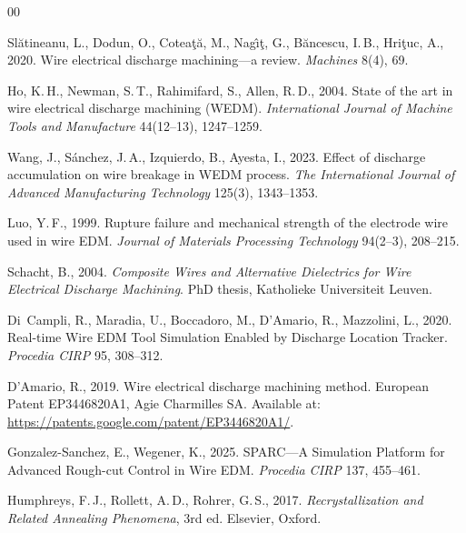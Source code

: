\documentclass[5p,times,procedia]{elsarticle}
\begin{document}
 \begin{thebibliography}{00}


Sl{\u{a}}tineanu, L., Dodun, O., Cotea{\c{t}}{\u{a}}, M., Nag{\^\i}{\c{t}}, G., B{\u{a}}ncescu, I.\,B., Hri{\c{t}}uc, A., 2020.
Wire electrical discharge machining---a review.
\textit{Machines} 8(4), 69.

Ho, K.\,H., Newman, S.\,T., Rahimifard, S., Allen, R.\,D., 2004.
State of the art in wire electrical discharge machining (WEDM).
\textit{International Journal of Machine Tools and Manufacture} 44(12--13), 1247--1259.

Wang, J., S{\'a}nchez, J.\,A., Izquierdo, B., Ayesta, I., 2023.
Effect of discharge accumulation on wire breakage in WEDM process.
\textit{The International Journal of Advanced Manufacturing Technology} 125(3), 1343--1353.

Luo, Y.\,F., 1999.
Rupture failure and mechanical strength of the electrode wire used in wire EDM.
\textit{Journal of Materials Processing Technology} 94(2--3), 208--215.

Schacht, B., 2004.
\textit{Composite Wires and Alternative Dielectrics for Wire Electrical Discharge Machining}.
PhD thesis, Katholieke Universiteit Leuven.

Di~Campli, R., Maradia, U., Boccadoro, M., D'Amario, R., Mazzolini, L., 2020.
Real-time Wire EDM Tool Simulation Enabled by Discharge Location Tracker.
\textit{Procedia CIRP} 95, 308--312.

D'Amario, R., 2019.
Wire electrical discharge machining method.
European Patent EP3446820A1, Agie Charmilles SA.
Available at: \url{https://patents.google.com/patent/EP3446820A1/}.

Gonzalez-Sanchez, E., Wegener, K., 2025.
SPARC---A Simulation Platform for Advanced Rough-cut Control in Wire EDM.
\textit{Procedia CIRP} 137, 455--461.

Humphreys, F.\,J., Rollett, A.\,D., Rohrer, G.\,S., 2017.
\textit{Recrystallization and Related Annealing Phenomena}, 3rd ed.
Elsevier, Oxford.


\end{thebibliography}
\end{document}
